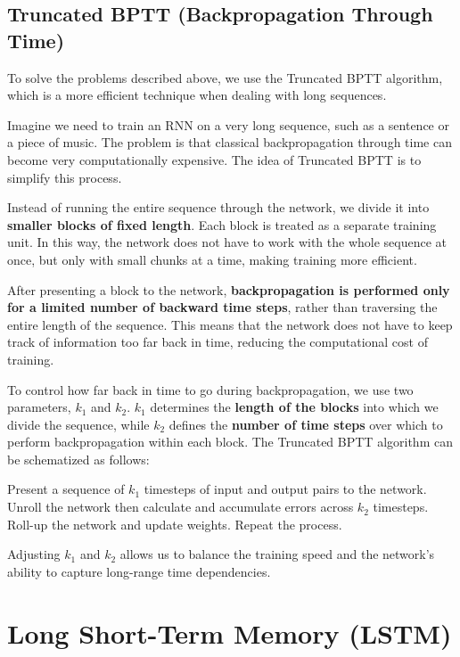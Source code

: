 \subsection{Truncated BPTT (Backpropagation Through Time)}

To solve the problems described above, we use the Truncated BPTT algorithm, which is a more efficient technique when dealing with long sequences.

Imagine we need to train an RNN on a very long sequence, such as a sentence or a piece of music. The problem is that classical backpropagation through time can become very computationally expensive. The idea of Truncated BPTT is to simplify this process.

Instead of running the entire sequence through the network, we divide it into \textbf{smaller blocks of fixed length}. Each block is treated as a separate training unit. In this way, the network does not have to work with the whole sequence at once, but only with small chunks at a time, making training more efficient.

After presenting a block to the network, \textbf{backpropagation is performed only for a limited number of backward time steps}, rather than traversing the entire length of the sequence. This means that the network does not have to keep track of information too far back in time, reducing the computational cost of training.

To control how far back in time to go during backpropagation, we use two parameters, $k_1$ and $k_2$. $k_1$ determines the \textbf{length of the blocks} into which we divide the sequence, while $k_2$ defines the \textbf{number of time steps} over which to perform backpropagation within each block. The Truncated BPTT algorithm can be schematized as follows:

\begin{algorithm}
\renewcommand\thealgorithm{}
\caption{}
\begin{algorithmic}[1]
\STATE Present a sequence of $k_1$ timesteps of input and output pairs to the network.
\STATE Unroll the network then calculate and accumulate errors across $k_2$ timesteps.
\STATE Roll-up the network and update weights.
\STATE Repeat the process.
\end{algorithmic}
\end{algorithm}
Adjusting $k_1$ and $k_2$ allows us to balance the training speed and the network's ability to capture long-range time dependencies.

\section{Long Short-Term Memory (LSTM)}

